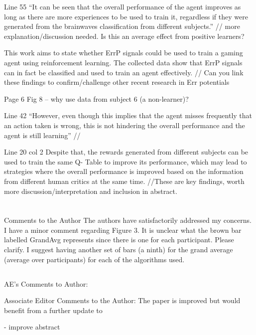 \documentclass[journal,onecolumn,12pt]{IEEEtran}
\begin{document}
Line 55 “It can be seen that the overall performance of the agent improves as long as there are more experiences to be used to train it, regardless if they were generated from the brainwaves classification from different subjects.” // more explanation/discussion needed. Is this an average effect from positive learners?


This work aims to state whether ErrP signals could be used to train a gaming agent using reinforcement learning. The collected data show that ErrP signals can in fact be classified and used to train an agent effectively. // Can you link these findings to confirm/challenge other recent research in Err potentials


Page 6
Fig 8 – why use data from subject 6 (a non-learner)?


Line 42 “However, even though this implies that the agent misses frequently that an action taken is wrong, this is not hindering the overall performance and the agent is still learning” //


Line 20 col 2 Despite that, the rewards generated from different subjects can be used to train the same Q- Table to improve its performance, which may lead to strategies where the overall performance is improved based on the information from different human critics at the same time.
//These are key findings, worth more discussion/interpretation and inclusion in abstract.



\section*{}

Comments to the Author
The authors have satisfactorily addressed my concerns. I have a minor comment regarding Figure 3. It is unclear what the brown bar labelled GrandAvg represents since there is one for each participant. Please clarify. I suggest having another set of bars (a ninth) for the grand average (average over participants) for each of the algorithms used.


\subsection*{}
AE's Comments to Author:

Associate Editor
Comments to the Author:
The paper is improved but would benefit from a further update to 

- improve abstract
\end{document}
